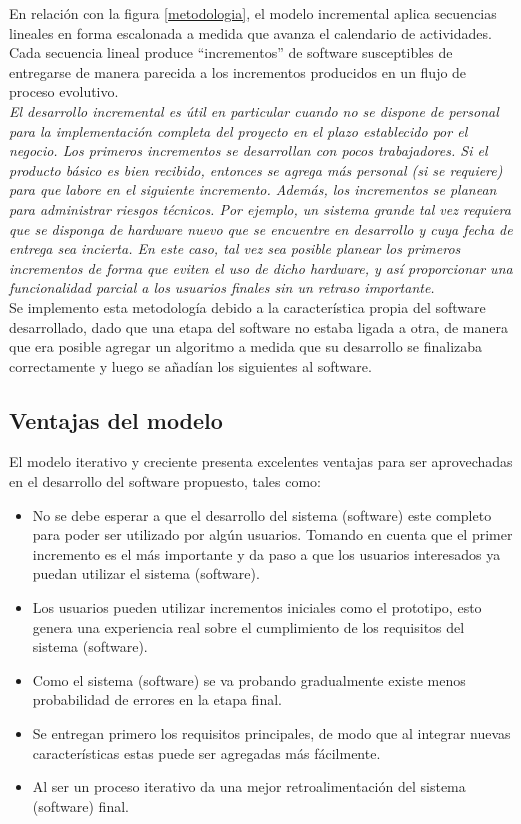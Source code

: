 En relación con la figura \ref{metodologia}, el modelo incremental aplica secuencias lineales en forma escalonada a medida que avanza el calendario de actividades. Cada secuencia lineal produce “incrementos” de software susceptibles de entregarse \cite{libromcd} de manera parecida a los incrementos producidos en un flujo de proceso evolutivo. \cite[pág. 35]{pressman1988ingenieria}\\


\textit{El desarrollo incremental es útil en particular cuando no se dispone de personal para la implementación completa del proyecto en el plazo establecido por el negocio. Los primeros incrementos se desarrollan con pocos trabajadores. Si el producto básico es bien recibido, entonces se agrega más personal (si se requiere) para que labore en el siguiente incremento. Además, los incrementos se planean para administrar riesgos técnicos. Por ejemplo, un sistema grande tal vez requiera que se disponga de hardware nuevo que se encuentre en desarrollo y cuya fecha de entrega sea incierta. En este caso, tal vez sea posible planear los primeros incrementos de forma que eviten el uso de dicho hardware, y así proporcionar una funcionalidad parcial a los usuarios finales sin un retraso importante.} \cite[pág. 36]{pressman1988ingenieria}\\

Se implemento esta metodología debido a la característica propia del software desarrollado, dado que una etapa del software no estaba ligada a otra, de manera que era posible agregar un algoritmo a medida que su desarrollo se finalizaba correctamente y luego se añadían los siguientes al software.


\subsection*{Ventajas del modelo}
El modelo iterativo y creciente presenta excelentes ventajas para ser aprovechadas en el desarrollo del software propuesto, tales como:
\begin{itemize}
\item No se debe esperar a que el desarrollo del sistema (software) este completo para poder ser utilizado por algún usuarios. Tomando en cuenta que el primer incremento es el más importante y da paso a que los usuarios interesados ya puedan utilizar el sistema (software).
\item Los usuarios pueden utilizar incrementos iniciales como el prototipo, esto genera una experiencia real sobre el cumplimiento de los requisitos del sistema (software).
\item Como el sistema (software) se va probando gradualmente existe menos probabilidad de errores en la etapa final.
\item Se entregan primero los requisitos principales, de modo que al integrar nuevas características estas puede ser agregadas más fácilmente.
\item Al ser un proceso iterativo da una mejor retroalimentación del sistema (software) final.  
\end{itemize}

